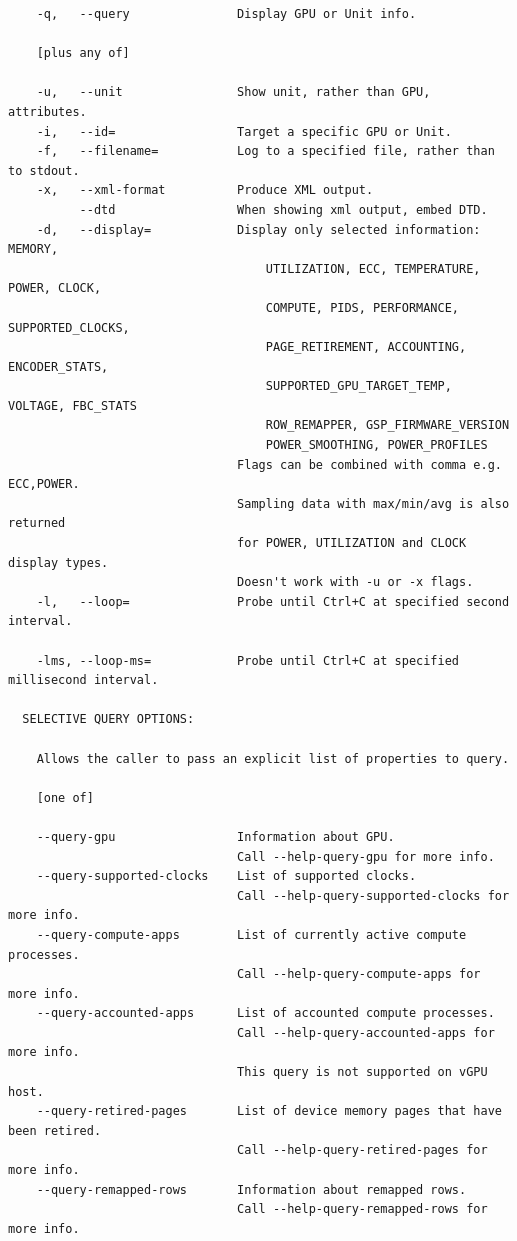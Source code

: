 \begin{lstlisting}
    -q,   --query               Display GPU or Unit info.

    [plus any of]

    -u,   --unit                Show unit, rather than GPU, attributes.
    -i,   --id=                 Target a specific GPU or Unit.
    -f,   --filename=           Log to a specified file, rather than to stdout.
    -x,   --xml-format          Produce XML output.
          --dtd                 When showing xml output, embed DTD.
    -d,   --display=            Display only selected information: MEMORY,
                                    UTILIZATION, ECC, TEMPERATURE, POWER, CLOCK,
                                    COMPUTE, PIDS, PERFORMANCE, SUPPORTED_CLOCKS,
                                    PAGE_RETIREMENT, ACCOUNTING, ENCODER_STATS,
                                    SUPPORTED_GPU_TARGET_TEMP, VOLTAGE, FBC_STATS
                                    ROW_REMAPPER, GSP_FIRMWARE_VERSION
                                    POWER_SMOOTHING, POWER_PROFILES
                                Flags can be combined with comma e.g. ECC,POWER.
                                Sampling data with max/min/avg is also returned
                                for POWER, UTILIZATION and CLOCK display types.
                                Doesn't work with -u or -x flags.
    -l,   --loop=               Probe until Ctrl+C at specified second interval.

    -lms, --loop-ms=            Probe until Ctrl+C at specified millisecond interval.

  SELECTIVE QUERY OPTIONS:

    Allows the caller to pass an explicit list of properties to query.

    [one of]

    --query-gpu                 Information about GPU.
                                Call --help-query-gpu for more info.
    --query-supported-clocks    List of supported clocks.
                                Call --help-query-supported-clocks for more info.
    --query-compute-apps        List of currently active compute processes.
                                Call --help-query-compute-apps for more info.
    --query-accounted-apps      List of accounted compute processes.
                                Call --help-query-accounted-apps for more info.
                                This query is not supported on vGPU host.
    --query-retired-pages       List of device memory pages that have been retired.
                                Call --help-query-retired-pages for more info.
    --query-remapped-rows       Information about remapped rows.
                                Call --help-query-remapped-rows for more info.


\end{lstlisting}
